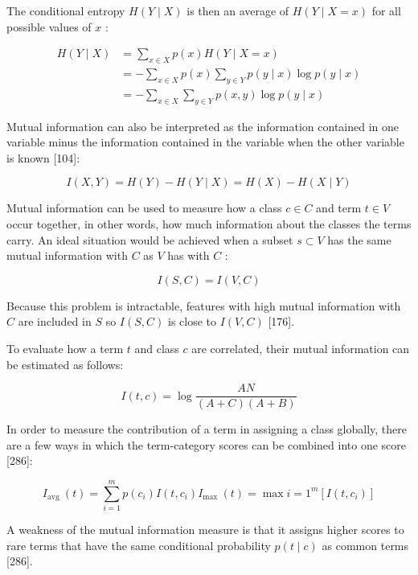 \documentclass[10pt]{book}
\begin{document}
The conditional entropy $H(Y \mid X)$ is then an average of $H(Y \mid X=x)$ for all possible values of $x$ :


\begin{align*}
H(Y \mid X) & =\sum_{x \in X} p(x) H(Y \mid X=x) \\
& =-\sum_{x \in X} p(x) \sum_{y \in Y} p(y \mid x) \log p(y \mid x)  \tag{14.13}\\
& =-\sum_{x \in X} \sum_{y \in Y} p(x, y) \log p(y \mid x)
\end{align*}


Mutual information can also be interpreted as the information contained in one variable minus the information contained in the variable when the other variable is known [104]:


\begin{equation*}
I(X, Y)=H(Y)-H(Y \mid X)=H(X)-H(X \mid Y) \tag{14.14}
\end{equation*}


Mutual information can be used to measure how a class $c \in C$ and term $t \in V$ occur together, in other words, how much information about the classes the terms carry. An ideal situation would be achieved when a subset $s \subset V$ has the same mutual information with $C$ as $V$ has with $C$ :


\begin{equation*}
I(S, C)=I(V, C) \tag{14.15}
\end{equation*}


Because this problem is intractable, features with high mutual information with $C$ are included in $S$ so $I(S, C)$ is close to $I(V, C)$ [176].

To evaluate how a term $t$ and class $c$ are correlated, their mutual information can be estimated as follows:


\begin{equation*}
I(t, c)=\log \frac{A N}{(A+C)(A+B)} \tag{14.16}
\end{equation*}


In order to measure the contribution of a term in assigning a class globally, there are a few ways in which the term-category scores can be combined into one score [286]:


\begin{equation*}
I_{\text {avg }}(t)=\sum_{i=1}^{m} p\left(c_{i}\right) I\left(t, c_{i}\right) I_{\text {max }}(t)=\max i=1^{m}\left[I\left(t, c_{i}\right)\right] \tag{14.17}
\end{equation*}


A weakness of the mutual information measure is that it assigns higher scores to rare terms that have the same conditional probability $p(t \mid c)$ as common terms [286].
\end{document}
